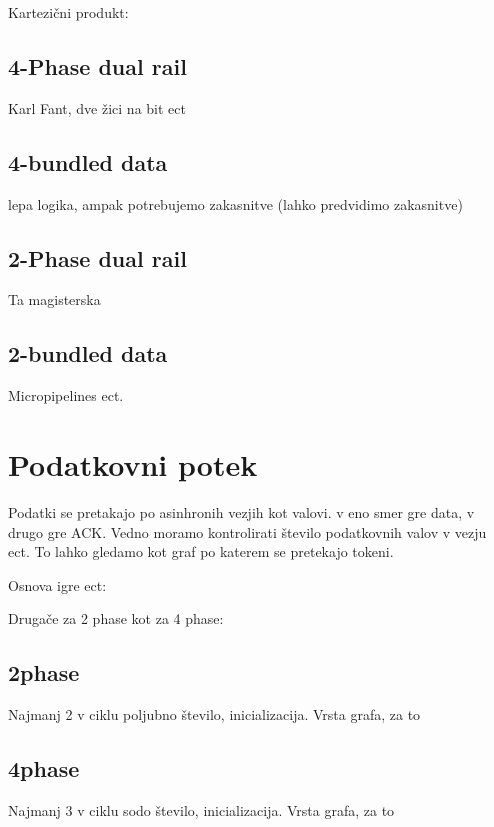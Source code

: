 Kartezični produkt:

\subsection{4-Phase dual rail} \label{b}
Karl Fant, dve žici na bit ect

\subsection{4-bundled data} \label{b}
lepa logika, ampak potrebujemo zakasnitve (lahko predvidimo zakasnitve)

\subsection{2-Phase dual rail} \label{b}
Ta magisterska

\subsection{2-bundled data} \label{b}
Micropipelines ect.


\section{Podatkovni potek} \label{a}
Podatki se pretakajo po asinhronih vezjih kot valovi. v eno smer gre data, v drugo gre ACK. Vedno moramo kontrolirati število podatkovnih valov v vezju ect.
To lahko gledamo kot graf po katerem se pretekajo tokeni. 

Osnova igre ect:

Drugače za 2 phase kot za 4 phase:

\subsection{2phase} \label{b}
Najmanj 2 v ciklu poljubno število, inicializacija. Vrsta grafa, za to

\subsection{4phase} \label{b}
Najmanj 3 v ciklu sodo število, inicializacija. Vrsta grafa, za to

